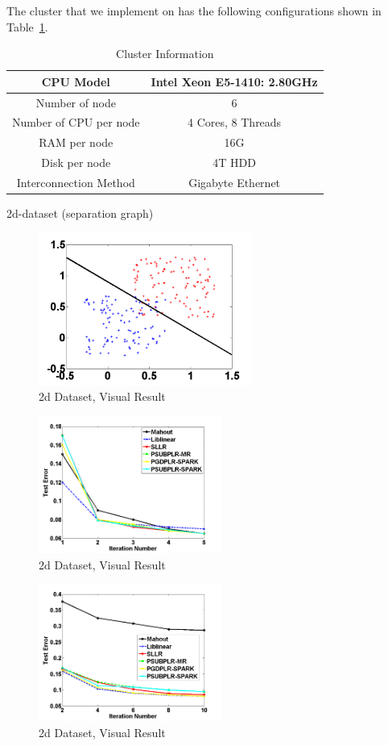 \documentclass{llncs}
\begin{document}
The cluster that we implement on has the following configurations shown in Table~\ref{tab:table2}.
\begin{table}[h]
\centering
\caption{Cluster Information}\label{tab:table2}
\begin{tabular}{|c|c|}
\hline
    CPU Model & Intel Xeon E5-1410: 2.80GHz \\
\hline
    Number of node & 6 \\
\hline
    Number of CPU per node & 4 Cores, 8 Threads \\
\hline
    RAM per node & 16G \\
\hline
    Disk per node & 4T HDD\\
\hline
    Interconnection Method & Gigabyte Ethernet  \\
\hline
\end{tabular}
\end{table}

2d-dataset (separation graph)
\begin{figure}[tb] \label{fig:02}
\center \includegraphics[height=5cm,width=7cm]{img/show-2d.png}
\caption{2d Dataset, Visual Result}
\end{figure}


\begin{figure}[tb] \label{fig:03}
\center \includegraphics[height=4.5cm,width=6cm]{img/2d_accuracy_iteration.png}
\caption{2d Dataset, Visual Result}
\end{figure}

\begin{figure}[tb] \label{fig:04}
\center \includegraphics[height=4.5cm,width=6cm]{img/20NewsGroup_accuracy_iteration.png}
\caption{2d Dataset, Visual Result}
\end{figure}
\end{document}
